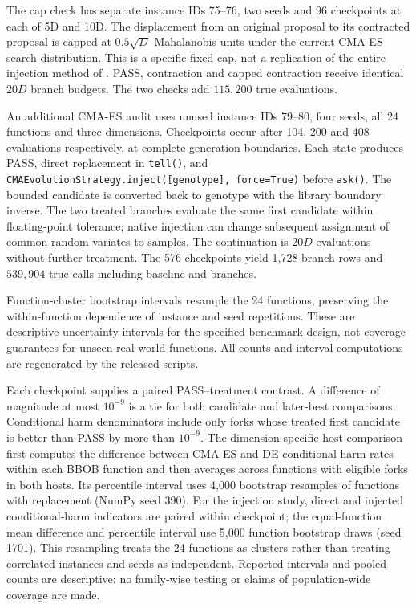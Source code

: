\documentclass[10pt,letterpaper]{article}
\begin{document}
The cap check has separate instance IDs 75--76, two seeds and 96 checkpoints at each of 5D and 10D. The displacement from an original proposal to its contracted proposal is capped at $0.5\sqrt D$ Mahalanobis units under the current CMA-ES search distribution. This is a specific fixed cap, not a replication of the entire injection method of \cite{hansen2011inject}. PASS, contraction and capped contraction receive identical $20D$ branch budgets. The two checks add $115{,}200$ true evaluations.

An additional CMA-ES audit uses unused instance IDs 79--80, four seeds, all 24 functions and three dimensions. Checkpoints occur after 104, 200 and 408 evaluations respectively, at complete generation boundaries. Each state produces PASS, direct replacement in \texttt{tell()}, and \texttt{CMAEvolutionStrategy.inject([genotype], force=True)} before \texttt{ask()}. The bounded candidate is converted back to genotype with the library boundary inverse. The two treated branches evaluate the same first candidate within floating-point tolerance; native injection can change subsequent assignment of common random variates to samples. The continuation is $20D$ evaluations without further treatment. The 576 checkpoints yield 1,728 branch rows and $539{,}904$ true calls including baseline and branches.

Function-cluster bootstrap intervals resample the 24 functions, preserving the within-function dependence of instance and seed repetitions. These are descriptive uncertainty intervals for the specified benchmark design, not coverage guarantees for unseen real-world functions. All counts and interval computations are regenerated by the released scripts.

Each checkpoint supplies a paired PASS--treatment contrast. A difference of magnitude at most $10^{-9}$ is a tie for both candidate and later-best comparisons. Conditional harm denominators include only forks whose treated first candidate is better than PASS by more than $10^{-9}$. The dimension-specific host comparison first computes the difference between CMA-ES and DE conditional harm rates within each BBOB function and then averages across functions with eligible forks in both hosts. Its percentile interval uses 4,000 bootstrap resamples of functions with replacement (NumPy seed 390). For the injection study, direct and injected conditional-harm indicators are paired within checkpoint; the equal-function mean difference and percentile interval use 5,000 function bootstrap draws (seed 1701). This resampling treats the 24 functions as clusters rather than treating correlated instances and seeds as independent. Reported intervals and pooled counts are descriptive: no family-wise testing or claims of population-wide coverage are made.
\end{document}
